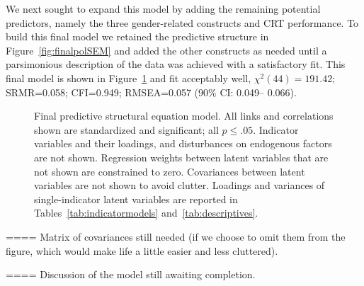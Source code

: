 \documentclass[fignum,man]{apa}\usepackage[]{graphicx}\usepackage[]{color}
\begin{document}
We next sought to expand this model by adding the remaining potential predictors,
namely the three gender-related constructs and CRT performance. 
To build this final model we retained the predictive structure in Figure~\ref{fig:finalpolSEM}
and added the other constructs as needed until a parsimonious 
description of the data was achieved with a satisfactory fit.
This final model is shown in Figure~\ref{fig:superSEM} and
fit acceptably well, 
$\chi^2(44)=191.42$; 
SRMR=0.058; CFI=0.949; 
RMSEA=0.057 (90\% CI:
0.049--
0.066).
\begin{figure}[tp] %
\caption{Final predictive structural equation model. 
	All links and correlations shown are 
	standardized and significant; all $p \leq .05$.
	Indicator variables and their loadings, and disturbances on endogenous factors are not
	shown. Regression weights between latent variables that are not shown are 
	constrained to zero. Covariances between latent variables are not shown to avoid clutter.
	Loadings and variances of single-indicator latent 
	variables are reported in Tables~\ref{tab:indicatormodels}
	and~\ref{tab:descriptives}.}
\label{fig:superSEM}
\end{figure}


==== Matrix of covariances still needed (if we choose to omit them from the figure, which would make life a little easier and less cluttered).

==== Discussion of the model still awaiting completion.

\end{document}
